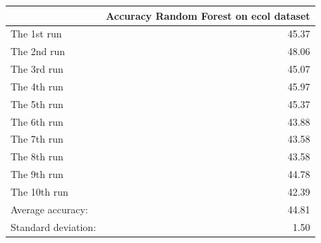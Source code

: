 \begin{tabular}{lr}
\toprule
{} &  Accuracy Random Forest on ecol dataset \\
\midrule
The 1st run         &                                   45.37 \\
The 2nd run         &                                   48.06 \\
The 3rd run         &                                   45.07 \\
The 4th run         &                                   45.97 \\
The 5th run         &                                   45.37 \\
The 6th run         &                                   43.88 \\
The 7th run         &                                   43.58 \\
The 8th run         &                                   43.58 \\
The 9th run         &                                   44.78 \\
The 10th run        &                                   42.39 \\
Average accuracy:   &                                   44.81 \\
Standard deviation: &                                    1.50 \\
\bottomrule
\end{tabular}
